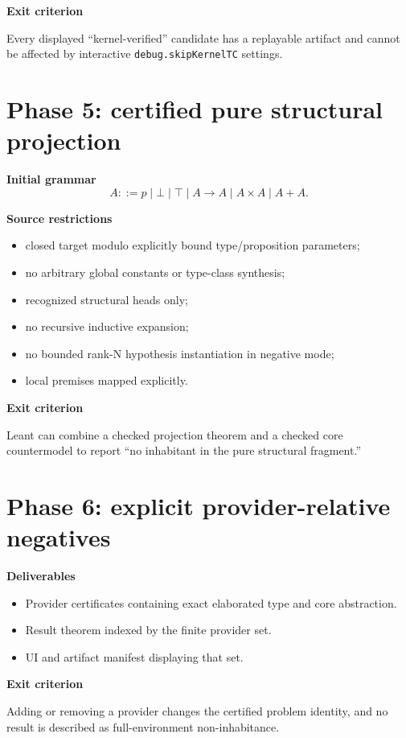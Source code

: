 \documentclass[11pt,letterpaper,openany]{report}
\theoremstyle{definition}
\theoremstyle{remark}
\newcommand{\code}[1]{\texttt{#1}}
\begin{document}
\textbf{Exit criterion}

Every displayed ``kernel-verified'' candidate has a replayable artifact and cannot be affected by interactive \code{debug.skipKernelTC} settings.

\section{Phase 5: certified pure structural projection}

\textbf{Initial grammar}
\[
  A ::= p \mid \bot \mid \top \mid A\to A \mid A\times A \mid A+A.
\]

\textbf{Source restrictions}
\begin{itemize}
\item closed target modulo explicitly bound type/proposition parameters;
\item no arbitrary global constants or type-class synthesis;
\item recognized structural heads only;
\item no recursive inductive expansion;
\item no bounded rank-N hypothesis instantiation in negative mode;
\item local premises mapped explicitly.
\end{itemize}

\textbf{Exit criterion}

Leant can combine a checked projection theorem and a checked core countermodel to report ``no inhabitant in the pure structural fragment.''

\section{Phase 6: explicit provider-relative negatives}

\textbf{Deliverables}
\begin{itemize}
\item Provider certificates containing exact elaborated type and core abstraction.
\item Result theorem indexed by the finite provider set.
\item UI and artifact manifest displaying that set.
\end{itemize}

\textbf{Exit criterion}

Adding or removing a provider changes the certified problem identity, and no result is described as full-environment non-inhabitance.
\end{document}

